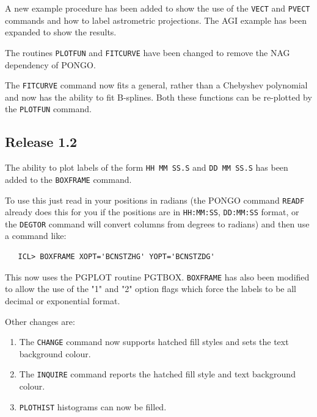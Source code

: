 \documentclass[twoside,11pt]{article}
\newcommand{\htmlref}[2]{#1}
\newcommand{\xref}[3]{#1}
\renewcommand{\_}{\texttt{\symbol{95}}}
\newcommand{\cnam}[1]{{\tt #1}}
\newcommand{\iref} [1]{\htmlref{#1}{#1}}
\begin{document}
A new example procedure has been added to show the use of the
\cnam{\iref{VECT}} and \cnam{\iref{PVECT}} commands and how to label
astrometric projections.  The AGI example has been expanded to show
the results.

The routines \cnam{\iref{PLOTFUN}} and \cnam{\iref{FITCURVE}} have
been changed to remove the NAG dependency of PONGO.

The \cnam{\iref{FITCURVE}} command now fits a general, rather than a Chebyshev
polynomial and now has the ability to fit B-splines. Both these
functions can be re-plotted by the \cnam{\iref{PLOTFUN}} command.

\subsection{Release 1.2}

The ability to plot labels of the form \verb+HH MM SS.S+ and
\verb+DD MM SS.S+ has been added to the \cnam{\iref{BOXFRAME}}
command.

To use this just read in your positions in radians (the PONGO
command \cnam{\iref{READF}} already does this for you if the
positions are in \verb+HH:MM:SS+, \verb+DD:MM:SS+ format, or the
\cnam{\iref{DEGTOR}} command will convert
columns from degrees to radians) and then use a command like:
\begin{verbatim}
   ICL> BOXFRAME XOPT='BCNSTZHG' YOPT='BCNSTZDG'
\end{verbatim}
This now uses the \xref{PGPLOT}{sun15}{} routine
\xref{PGTBOX}{sun15}{PGTBOX}.
\cnam{\iref{BOXFRAME}} has also been modified to allow the use of the "1" and "2"
option flags which force the labels to be all decimal or exponential
format.

Other changes are:
\begin{enumerate}
\item The \cnam{\iref{CHANGE}} command now supports hatched fill styles
and sets the
text background colour.
\item The \cnam{\iref{INQUIRE}} command reports the hatched fill style and text background
colour.
\item \cnam{\iref{PLOTHIST}} histograms can now be filled.
\end{enumerate}
\end{document}
